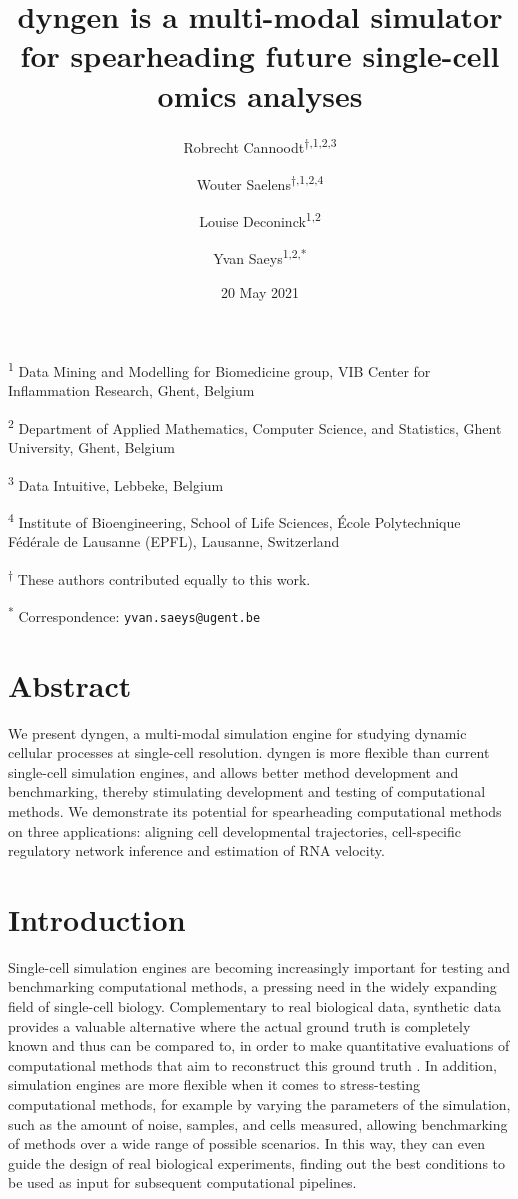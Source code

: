 \documentclass[10pt, a4paper]{article}
\title{dyngen is a multi-modal simulator for spearheading future single-cell omics analyses}
\author{Robrecht Cannoodt\textsuperscript{$\dagger{}$,1,2,3} \and Wouter Saelens\textsuperscript{$\dagger{}$,1,2,4} \and Louise Deconinck\textsuperscript{1,2} \and Yvan Saeys\textsuperscript{1,2,*}}
\date{20 May 2021}
\begin{document}
\maketitle

\textsuperscript{1} Data Mining and Modelling for Biomedicine group, VIB
Center for Inflammation Research, Ghent, Belgium

\textsuperscript{2} Department of Applied Mathematics, Computer Science,
and Statistics, Ghent University, Ghent, Belgium

\textsuperscript{3} Data Intuitive, Lebbeke, Belgium

\textsuperscript{4} Institute of Bioengineering, School of Life
Sciences, École Polytechnique Fédérale de Lausanne (EPFL), Lausanne,
Switzerland

\textsuperscript{$\dagger{}$} These authors contributed equally to this work.

\textsuperscript{*} Correspondence: \texttt{yvan.saeys@ugent.be}

\hypertarget{abstract}{%
	\section{Abstract}\label{abstract}}

We present dyngen, a multi-modal simulation engine for studying dynamic
cellular processes at single-cell resolution. dyngen is more flexible
than current single-cell simulation engines, and allows better method
development and benchmarking, thereby stimulating development and
testing of computational methods. We demonstrate its potential for
spearheading computational methods on three applications: aligning cell
developmental trajectories, cell-specific regulatory network inference
and estimation of RNA velocity.

\hypertarget{introduction}{%
	\section{Introduction}\label{introduction}}

Single-cell simulation engines are becoming increasingly important for
testing and benchmarking computational methods, a pressing need in the
widely expanding field of single-cell biology. Complementary to real
biological data, synthetic data provides a valuable alternative where
the actual ground truth is completely known and thus can be compared to,
in order to make quantitative evaluations of computational methods that
aim to reconstruct this ground truth
\cite{zappia_splattersimulationsinglecell_2017}. In addition,
simulation engines are more flexible when it comes to stress-testing
computational methods, for example by varying the parameters of the
simulation, such as the amount of noise, samples, and cells measured,
allowing benchmarking of methods over a wide range of possible
scenarios. In this way, they can even guide the design of real
biological experiments, finding out the best conditions to be used as
input for subsequent computational pipelines.
\end{document}
